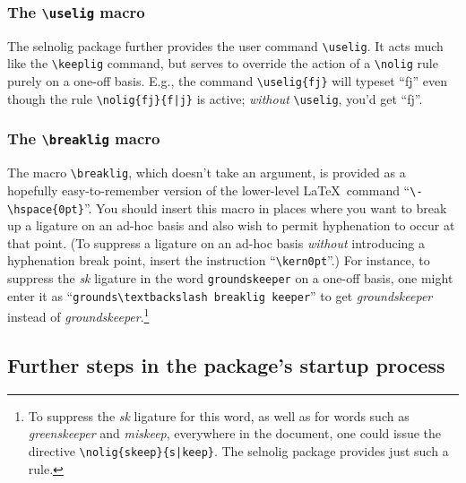 \documentclass[11pt]{article}
\newcommand{\pkg}[1]{\textsf{#1}}
\newcommand{\cmmd}[1]{\texttt{\textbackslash #1}}
\newcommand{\uselig}[1]{\selnoligoff\mbox{#1}\selnoligon}
\begin{document}
\subsubsection{The \cmmd{uselig} macro} 
\label{sec:uselig}

The \pkg{selnolig} package further provides the user command \cmmd{uselig}. It acts much like the \cmmd{keeplig} command, but serves to override the action of a \cmmd{nolig} rule purely on a one-off basis. E.g., the command \Verb+\uselig{fj}+ will typeset \enquote{\uselig{fj}} even though the rule \Verb+\nolig{fj}{f|j}+ is active; \emph{without} \cmmd{uselig}, you'd get \enquote{fj}.



\subsubsection{The \cmmd{breaklig} macro} 
\label{sec:breaklig}

The macro \cmmd{breaklig}, which doesn't take an argument, is provided as a hopefully easy-to-remember version of the lower-level \LaTeX\ command ``\Verb+\-\hspace{0pt}+''. You should insert this macro in places where you want to break up a ligature on an ad-hoc basis and also wish to permit hyphenation to occur at that point. (To suppress a ligature on an ad-hoc basis \emph{without} introducing a hyphenation break point, insert the instruction \enquote{\cmmd{kern0pt}}.) For instance, to suppress the {\ebg\emph{sk}} ligature in the word \Verb+groundskeeper+ on a one-off basis, one might enter it as \enquote{\Verb+grounds\textbackslash breaklig keeper+} to get \emph{\ebg groundskeeper} instead of \emph{\ebg ground\mbox{sk}eeper}.\footnote{To suppress the {\ebg \emph{sk}} ligature for this word, as well as for words such as \emph{\ebg greenskeeper} and \emph{\ebg miskeep}, everywhere in the document, one could issue the directive \Verb+\nolig{skeep}{s|keep}+. The \pkg{selnolig} package provides just such a rule.}




\subsection{Further steps in the package's startup process}
\end{document}
